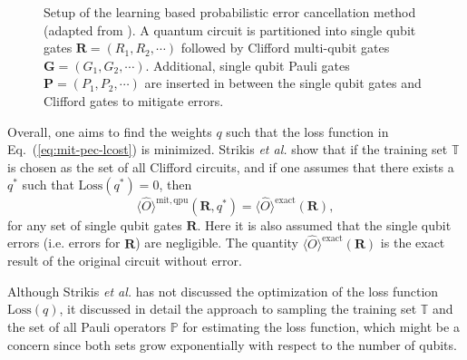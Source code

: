 \begin{figure}[ht]
    \centering
    
    \caption{Setup of the learning based probabilistic error cancellation method 
    (adapted from \citet{strikisLearningbasedQuantumError2020}).
    A quantum circuit is partitioned into single qubit gates $\mathbf{R}=(R_1,R_2,\cdots)$ followed by Clifford multi-qubit gates $\mathbf{G}=(G_1,G_2,\cdots)$. Additional, single qubit Pauli gates $\mathbf{P}=(P_1,P_2,\cdots )$ are inserted in between the single qubit gates and Clifford gates to mitigate errors.}
    \label{fig:mit-learning-PEC-setup}
\end{figure}

Overall, one aims to find the weights $q$ such that the loss function in Eq.~(\ref{eq:mit-pec-lcost}) is minimized. Strikis \textit{et al.} \cite{strikisLearningbasedQuantumError2020} show that if the training set $\mathbb{T}$ is chosen as the set of all Clifford circuits, and if one assumes that there exists a $q^{*}$ such that $\mathrm{Loss}\left( q^{*}\right) =0$, then
\begin{equation}
    \langle \hat{O} \rangle^{\mathrm{mit,qpu}}\left( \mathbf{R},q^{*}\right) =\langle \hat{O} \rangle^{\mathrm{exact}}\left( \mathbf{R}\right),
\end{equation}
for any set of single qubit gates $\mathbf{R}$. Here it is also assumed that the single qubit errors (i.e. errors for $\mathbf{R}$) are negligible. The quantity $\langle \hat{O} \rangle^{\mathrm{exact}}\left( \mathbf{R}\right)$ is the exact result of the original circuit without error.


Although Strikis \textit{et al.} \cite{strikisLearningbasedQuantumError2020} has not discussed the optimization of the loss function $\mathrm{Loss}(q)$, it discussed in detail the approach to sampling the training set $\mathbb{T}$ and the set of all Pauli operators $\mathbb{P}$ for estimating the loss function, which might be a concern since both sets grow exponentially with respect to the number of qubits.

